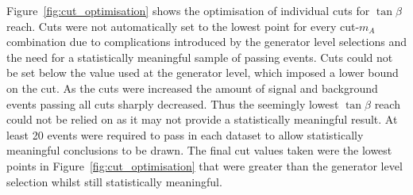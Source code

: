 Figure~\ref{fig:cut_optimisation} shows the optimisation of individual cuts for $\tan{\beta}$ reach. Cuts were not automatically set to the lowest point for every cut-$m_A$ combination due to complications introduced by the generator level selections and the need for a statistically meaningful sample of passing events. Cuts could not be set below the value used at the generator level, which imposed a lower bound on the cut. As the cuts were increased the amount of signal and background events passing all cuts sharply decreased. Thus the seemingly lowest $\tan{\beta}$ reach could not be relied on as it may not provide a statistically meaningful result. At least 20 events were required to pass in each dataset to allow statistically meaningful conclusions to be drawn. The final cut values taken were the lowest points in Figure~\ref{fig:cut_optimisation} that were greater than the generator level selection whilst still statistically meaningful. 



